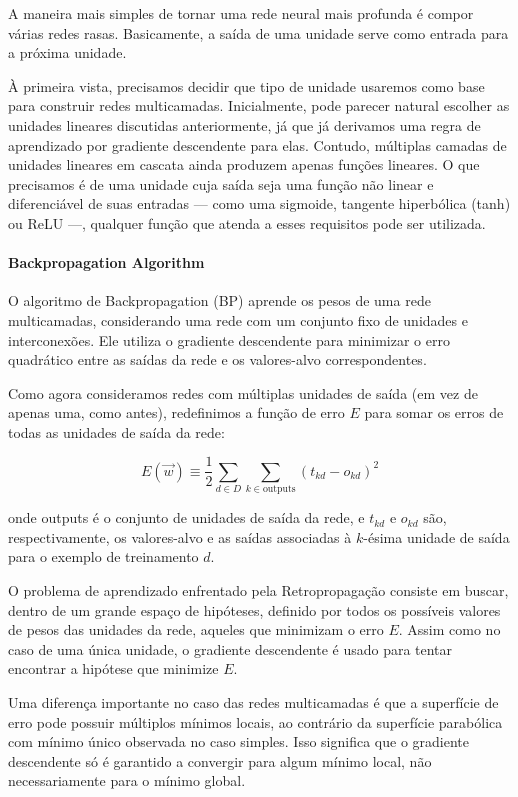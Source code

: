 \documentclass{tufte-handout}
\begin{document}
A maneira mais simples de tornar uma rede neural mais profunda é compor várias redes rasas. Basicamente, a saída de uma unidade serve como entrada para a próxima unidade.

À primeira vista, precisamos decidir que tipo de unidade usaremos como base para construir redes multicamadas. Inicialmente, pode parecer natural escolher as unidades lineares discutidas anteriormente, já que já derivamos uma regra de aprendizado por gradiente descendente para elas.
Contudo, múltiplas camadas de unidades lineares em cascata ainda produzem apenas funções lineares.
O que precisamos é de uma unidade cuja saída seja uma função não linear e diferenciável de suas entradas — como uma sigmoide, tangente hiperbólica (tanh) ou ReLU —, qualquer função que atenda a esses requisitos pode ser utilizada.


\paragraph{Backpropagation Algorithm }
O algoritmo de Backpropagation (BP) aprende os pesos de uma rede multicamadas, considerando uma rede com um conjunto fixo de unidades e interconexões.
Ele utiliza o gradiente descendente para minimizar o erro quadrático entre as saídas da rede e os valores-alvo correspondentes.

Como agora consideramos redes com múltiplas unidades de saída (em vez de apenas uma, como antes), redefinimos a função de erro $E$ para somar os erros de todas as unidades de saída da rede:

\begin{equation}
E(\Vec{w}) \equiv \frac{1}{2} \sum_{d \in D} \sum_{k \in \text{outputs}} (t_{kd} - o_{kd})^2
\end{equation}

onde outputs é o conjunto de unidades de saída da rede, e $t_{kd}$ e $o_{kd}$ são, respectivamente, os valores-alvo e as saídas associadas à $k$-ésima unidade de saída para o exemplo de treinamento $d$.

O problema de aprendizado enfrentado pela Retropropagação consiste em buscar, dentro de um grande espaço de hipóteses, definido por todos os possíveis valores de pesos das unidades da rede, aqueles que minimizam o erro $E$.
Assim como no caso de uma única unidade, o gradiente descendente é usado para tentar encontrar a hipótese que minimize $E$.

Uma diferença importante no caso das redes multicamadas é que a superfície de erro pode possuir múltiplos mínimos locais, ao contrário da superfície parabólica com mínimo único observada no caso simples.
Isso significa que o gradiente descendente só é garantido a convergir para algum mínimo local, não necessariamente para o mínimo global.
\end{document}

